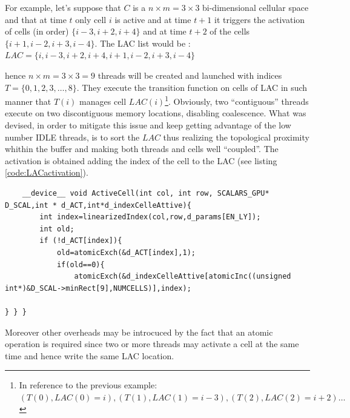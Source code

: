 For example, let's suppose that \(C\) is a \(n \times m = 3\times 3\)
 bi-dimensional cellular space and that at time \(t\) only cell \(i\) is active and at time \(t+1\) it
 triggers the activation of cells (in order) \(\{i-3,i+2,i+4\}\) and at time
 \(t+2\) of the cells \(\{i+1,i-2,i+3,i-4\}\).
 The LAC list would be : \(LAC=\{i,i-3,i+2,i+4,i+1,i-2,i+3,i-4\}\)

\begin{center}
 \end{center}
hence \(n \times m = 3\times 3 = 9\) threads will be created and launched with
indices \(T=\{0,1,2,3,\ldots,8\}\). They execute the transition
function on cells of LAC in such manner that \(T(i)\) manages cell
\(LAC(i)\)\footnote{In reference to the previous example: 
\((T(0),LAC(0)=i),(T(1),LAC(1)=i-3),(T(2),LAC(2)=i+2)\ldots\)}.
Obviously, two ``contiguous'' threads execute on two discontiguous memory
locations, disabling coalescence. What was devised, in order to
mitigate this issue and keep getting advantage of the low number IDLE threads, is to sort
the \(LAC\) thus realizing the topological proximity whithin the buffer 
and making both threads and cells well ``coupled''.
The activation is obtained adding the index of the cell to the LAC (see
listing \ref{code:LACactivation}).
\begin{lstlisting}
	__device__ void ActiveCell(int col, int row, SCALARS_GPU* D_SCAL,int * d_ACT,int*d_indexCelleAttive){
		int index=linearizedIndex(col,row,d_params[EN_LY]);
		int old;
		if (!d_ACT[index]){
			old=atomicExch(&d_ACT[index],1);
			if(old==0){
				atomicExch(&d_indexCelleAttive[atomicInc((unsigned int*)&D_SCAL->minRect[9],NUMCELLS)],index);
				
} } }
\end{lstlisting}
Moreover other overheads may be introcuced by the fact that an atomic operation
is required since two or more threads may activate a cell at the same time and
hence write the same LAC location.




